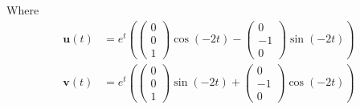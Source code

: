 \documentclass{article}
\theoremstyle{definition}
\begin{document}
    Where 
    \begin{align*}
        \bm u (t) &= e^t \left(
            \begin{pmatrix}
                0\\
                0 \\
                1
            \end{pmatrix}\cos(-2t) - \begin{pmatrix}
                0 \\
                -1 \\
                0
            \end{pmatrix}\sin(-2t)
        \right)\\
        \bm v(t) &= e^t \left(
            \begin{pmatrix}
                0\\
                0 \\
                1
            \end{pmatrix}\sin(-2t) + \begin{pmatrix}
                0 \\
                -1 \\
                0
            \end{pmatrix}\cos(-2t)
        \right)
    \end{align*}
\end{document}

